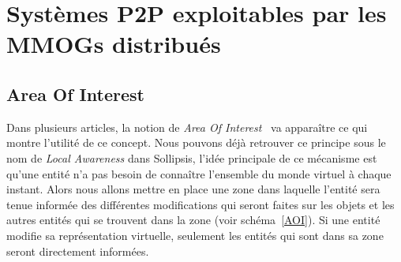 \section{Systèmes P2P exploitables par les MMOGs distribués}
	\subsection{Area Of Interest}
	Dans plusieurs articles, la notion de \textit{Area Of Interest}~\cite{1403002,1267692,1015507} va apparaître ce qui montre l'utilité de ce concept. Nous pouvons déjà retrouver ce principe sous le nom de \textit{Local Awareness} dans Sollipsis, l'idée principale de ce mécanisme est qu'une entité n'a pas besoin de connaître l'ensemble du monde virtuel à chaque instant. Alors nous allons mettre en place une zone dans laquelle l'entité sera tenue informée des différentes modifications qui seront faites sur les objets et les autres entités qui se trouvent dans la zone (voir schéma~\ref{AOI}). Si une entité modifie sa représentation virtuelle, seulement les entités qui sont dans sa zone seront directement informées.\\

